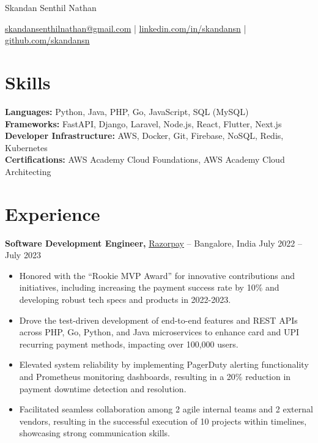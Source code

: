 \documentclass[11pt]{article}       %
\begin{document}
\centerline{\Huge Skandan Senthil Nathan}

\vspace{5pt}

\centerline{\href{mailto:skandansenthilnathan@gmail.com}{skandansenthilnathan@gmail.com} | \href{https://www.linkedin.com/in/skandansn/}{linkedin.com/in/skandansn} | \href{https://github.com/skandansn}{github.com/skandansn}}

\vspace{-10pt}

\section*{Skills}
\textbf{Languages:}  Python, Java, PHP, Go, JavaScript, SQL (MySQL) \\\textbf{Frameworks:}  FastAPI, Django, Laravel, Node.js, React, Flutter, Next.js  \\\textbf{Developer Infrastructure:}  AWS, Docker, Git, Firebase, NoSQL, Redis, Kubernetes \\\textbf{Certifications:}  AWS Academy Cloud Foundations, AWS Academy Cloud Architecting \\\label{skillsSection}


\vspace{-6.5pt}

\section*{Experience}
\textbf{Software Development Engineer,} \href{https://razorpay.com/}{Razorpay} -- Bangalore, India \hfill July 2022 -- July 2023 \\
\vspace{-9pt}
\begin{itemize}
  \label{sde}
  
\item Honored with the ``Rookie MVP Award'' for innovative contributions and initiatives, including increasing the payment success rate by 10\% and developing robust tech specs and products in 2022-2023.\item Drove the test-driven development of end-to-end features and REST APIs across PHP, Go, Python, and Java microservices to enhance card and UPI recurring payment methods, impacting over 100,000 users.\item Elevated system reliability by implementing PagerDuty alerting functionality and Prometheus monitoring dashboards, resulting in a 20\% reduction in payment downtime detection and resolution.\item Facilitated seamless collaboration among 2 agile internal teams and 2 external vendors, resulting in the successful execution of 10 projects within timelines, showcasing strong communication skills.\end{itemize}
\end{document}
